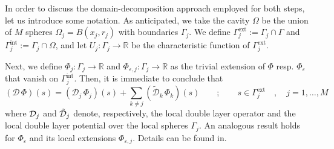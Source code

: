 In order to discuss the domain-decomposition approach employed for both steps, let us introduce some notation. As anticipated, we take the cavity $\Omega$ be the union of $M$ spheres $\Omega_j = B(x_j, r_j)$ with boundaries $\Gamma_j$. We define $\Gamma_j^\text{ext}:= \Gamma_j \cap \Gamma$ and $\Gamma_j^\text{int} := \Gamma_j \cap \Omega$, and let $U_j: \Gamma_j \to \mathbb{R}$ be the characteristic function of $\Gamma_j^\text{ext}$. 

Next, we define $\Phi_j : \Gamma_j \to \mathbb{R}$ and $\Phi_{\varepsilon,j} : \Gamma_j \to \mathbb{R}$ as the trivial   extension of $\Phi$ resp. $\Phi_\varepsilon$ that vanish on $\Gamma_j^\text{int}$.
Then, it is immediate to conclude that
\begin{equation}\label{eq:16}
(\mathcal{D} \, \Phi ) (s) = ( \mathcal{D}_j \, \Phi_j )(s) + \sum_{k \ne j} (\tilde{\mathcal{D}}_k \, \Phi_k )(s) \qquad ; \qquad s \in \Gamma_j^\text{ext} \quad, \quad  j = 1 , \ldots , M
\end{equation}
where $\mathcal{D}_j$ and $\tilde{\mathcal{D}}_j$ denote, respectively, the local double layer operator and the local double layer potential over the local spheres $\Gamma_j$. An analogous result holds for $\Phi_\varepsilon$ and its local extensions $\Phi_{\varepsilon,j}$. 
Details can be found in\cite{Stamm_JCP_DDPCM}.

